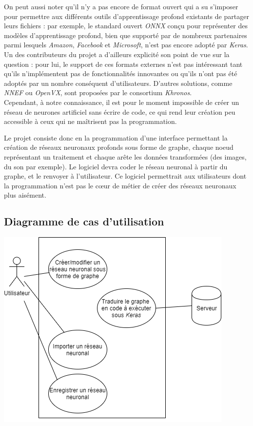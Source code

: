 \documentclass{article}
\begin{document}
On peut aussi noter qu'il n'y a pas encore de format ouvert qui a su s'imposer pour permettre aux différents outils d'apprentissage profond existants de partager leurs fichiers : par exemple, le standard ouvert \textit{ONNX}\cite{onnx2017} conçu pour représenter des modèles d'apprentissage profond, bien que supporté par de nombreux partenaires parmi lesquels \textit{Amazon}, \textit{Facebook} et \textit{Microsoft}, n'est pas encore adopté par \textit{Keras}. Un des contributeurs du projet a d'ailleurs explicité son point de vue sur la question : pour lui, le support de ces formats externes n'est pas intéressant tant qu'ils n'implémentent pas de fonctionnalités innovantes ou qu'ils n'ont pas été adoptés par un nombre conséquent d'utilisateurs\cite{cholletsavage}. D'autres solutions, comme \textit{NNEF}\cite{nnef2017} ou \textit{OpenVX}\cite{openvx2017}, sont proposées par le consortium \textit{Khronos}.\\

Cependant, à notre connaissance, il est pour le moment impossible de créer un réseau de neurones artificiel sans écrire de code, ce qui rend leur création peu accessible à ceux qui ne maîtrisent pas la programmation. \smallbreak

Le projet consiste donc en la programmation d’une interface permettant la création de réseaux neuronaux profonds sous forme de graphe, chaque noeud représentant un traitement et chaque arête les données transformées (des images, du son par exemple). Le logiciel devra coder le réseau neuronal à partir du graphe, et le renvoyer à l'utilisateur.
Ce logiciel permettrait aux utilisateurs dont la programmation n'est pas le cœur de métier de créer des réseaux neuronaux plus aisément.

\subsection{Diagramme de cas d'utilisation}

\includegraphics{UseCasePDP.png}
\end{document}

